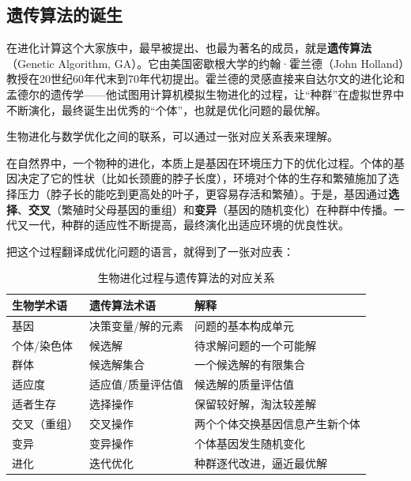 \documentclass[lang=cn,zihao=-4,a4paper,fontset=windows]{beautybook}
\begin{document}
\subsection{遗传算法的诞生}

在进化计算这个大家族中，最早被提出、也最为著名的成员，就是\textbf{遗传算法}（Genetic Algorithm, GA）。它由美国密歇根大学的约翰·霍兰德（John Holland）教授在20世纪60年代末到70年代初提出。霍兰德的灵感直接来自达尔文的进化论和孟德尔的遗传学——他试图用计算机模拟生物进化的过程，让“种群”在虚拟世界中不断演化，最终诞生出优秀的“个体”，也就是优化问题的最优解。

生物进化与数学优化之间的联系，可以通过一张对应关系表来理解。

在自然界中，一个物种的进化，本质上是基因在环境压力下的优化过程。个体的基因决定了它的性状（比如长颈鹿的脖子长度），环境对个体的生存和繁殖施加了选择压力（脖子长的能吃到更高处的叶子，更容易存活和繁殖）。于是，基因通过\textbf{选择}、\textbf{交叉}（繁殖时父母基因的重组）和\textbf{变异}（基因的随机变化）在种群中传播。一代又一代，种群的适应性不断提高，最终演化出适应环境的优良性状。

把这个过程翻译成优化问题的语言，就得到了一张对应表：

\begin{table}[h]
\centering
\caption{生物进化过程与遗传算法的对应关系}
\begin{tabular}{p{}p{}p{}}
\toprule
\textbf{生物学术语} & \textbf{遗传算法术语} & \textbf{解释} \\
\midrule
基因 & 决策变量/解的元素 & 问题的基本构成单元 \\
\hline
个体/染色体 & 候选解 & 待求解问题的一个可能解 \\
\hline
群体 & 候选解集合 & 一个候选解的有限集合 \\
\hline
适应度 & 适应值/质量评估值 & 候选解的质量评估值 \\
\hline
适者生存 & 选择操作 & 保留较好解，淘汰较差解 \\
\hline
交叉（重组） & 交叉操作 & 两个个体交换基因信息产生新个体 \\
\hline
变异 & 变异操作 & 个体基因发生随机变化 \\
\hline
进化 & 迭代优化 & 种群逐代改进，逼近最优解 \\
\bottomrule
\end{tabular}
\end{table}
\end{document}
